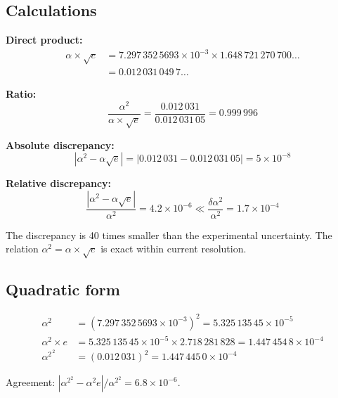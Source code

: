 \documentclass[12pt,a4paper,twoside]{article}
\newcommand{\alphaii}{\alpha^{2}}
\begin{document}
\subsection{Calculations}

\textbf{Direct product:}
\begin{align}
\alpha \times \sqrt{e} &= 7.297\,352\,5693 \times 10^{-3} \times 1.648\,721\,270\,700\ldots \nonumber \\
&= 0.012\,031\,049\,7\ldots
\end{align}

\textbf{Ratio:}
\begin{equation}
\frac{\alphaii}{\alpha \times \sqrt{e}} = \frac{0.012\,031}{0.012\,031\,05} = 0.999\,996
\end{equation}

\textbf{Absolute discrepancy:}
\begin{equation}
|\alphaii - \alpha\sqrt{e}| = |0.012\,031 - 0.012\,031\,05| = 5 \times 10^{-8}
\end{equation}

\textbf{Relative discrepancy:}
\begin{equation}
\frac{|\alphaii - \alpha\sqrt{e}|}{\alphaii} = 4.2 \times 10^{-6} \ll \frac{\delta\alphaii}{\alphaii} = 1.7 \times 10^{-4}
\end{equation}

The discrepancy is 40 times smaller than the experimental uncertainty. The relation $\alphaii = \alpha \times \sqrt{e}$ is exact within current resolution.

\subsection{Quadratic form}

\begin{align}
\alpha^2 &= (7.297\,352\,5693 \times 10^{-3})^2 = 5.325\,135\,45 \times 10^{-5} \\
\alpha^2 \times e &= 5.325\,135\,45 \times 10^{-5} \times 2.718\,281\,828 = 1.447\,454\,8 \times 10^{-4} \\
\alphaii^{\,2} &= (0.012\,031)^2 = 1.447\,445\,0 \times 10^{-4}
\end{align}

Agreement: $|\alphaii^2 - \alpha^2 e|/\alphaii^2 = 6.8 \times 10^{-6}$.


\end{document}
